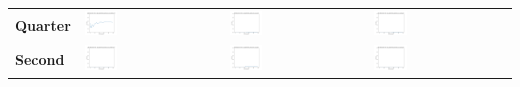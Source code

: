 \begin{tabular}{>{\centering\arraybackslash}m{}>{\centering\arraybackslash}m{}>{\centering\arraybackslash}m{}>{\centering\arraybackslash}m{}}
    \textbf{Quarter} & \includegraphics[width=0.25\textwidth]{images/win_rate_dqn_experiment_quarter_no_vs_random.png} &
    \includegraphics[width=0.25\textwidth]{images/win_rate_ql_experiment_quarter_no_vs_ql.png} &
    \includegraphics[width=0.25\textwidth]{images/win_rate_ql_experiment_quarter_no_vs_dqn.png} \\
    \textbf{Second} & \includegraphics[width=0.25\textwidth]{images/win_rate_ql_experiment_second_no_vs_random.png} &
    \includegraphics[width=0.25\textwidth]{images/win_rate_ql_experiment_second_no_vs_ql.png} &
    \includegraphics[width=0.25\textwidth]{images/win_rate_ql_experiment_second_no_vs_dqn.png} \\
  \end{tabular}

